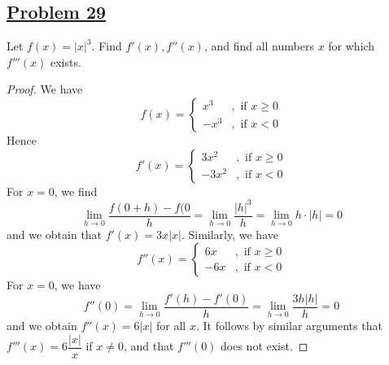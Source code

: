 \documentclass[10pt,letterpaper]{article}
\begin{document}
	\subsection*{{\color{purple}\underline{Problem 29}}}
	Let $f(x) = |x|^3$. Find $f'(x), f''(x)$, and find all numbers $x$ for which $f'''(x)$ exists. 
	\begin{proof}
		We have
		$$
		f(x) = 
		\begin{cases}
			x^3 &, \text{ if } x \geq 0 \\
			-x^3 &, \text{ if } x < 0		
		\end{cases}
		$$
		Hence
		$$
		f'(x) = 
		\begin{cases}
			3x^2 &, \text{ if } x \geq 0 \\
			-3x^2 &, \text{ if } x < 0		
		\end{cases}
		$$
		For $x = 0$, we find
		$$\displaystyle\lim_{h\to 0}\dfrac{f(0 + h) - f(0}{h} = \displaystyle\lim_{h\to 0}\dfrac{|h|^3}{h} = 
		\displaystyle\lim_{h\to 0} h \cdot |h| = 0$$
		and we obtain that $f'(x) = 3x|x|$.
		Similarly, we have
		$$
		f''(x) = 
		\begin{cases}
			6x &, \text{ if } x \geq 0 \\
			-6x &, \text{ if } x < 0		
		\end{cases}
		$$
		For $x = 0$, we have
		$$f''(0) = \displaystyle\lim_{h\to 0} \dfrac{f'(h) - f'(0)}{h} = \displaystyle\lim_{h\to 0} \dfrac{3h|h|}{h} = 0$$
		and we obtain $f''(x) = 6|x|$ for all $x$.
		It follows by similar arguments that $f'''(x) = 6 \dfrac{|x|}{x}$ if $x \neq 0$, and that $f'''(0)$ does not exist.
	\end{proof}
	
	
	
\end{document}
